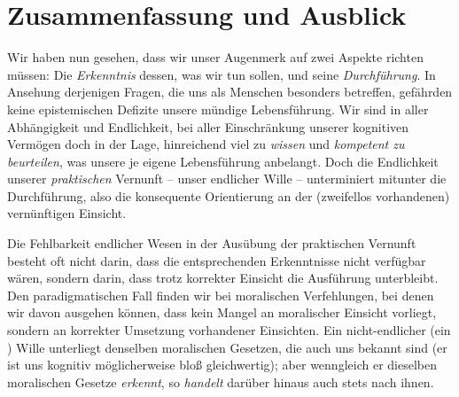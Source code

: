 \section{Zusammenfassung und Ausblick}
Wir haben nun gesehen, dass wir unser Augenmerk auf zwei Aspekte
richten müssen: Die \emph{Erkenntnis} dessen, was wir tun sollen, und seine
\emph{Durchführung}.
In Ansehung derjenigen Fragen, die uns als Menschen besonders betreffen,
gefährden keine epistemischen Defizite unsere mündige Lebensführung. Wir
sind in aller Abhängigkeit und Endlichkeit, bei aller Einschränkung unserer
kognitiven Vermögen doch in der Lage, hinreichend viel zu \emph{wissen} und
\emph{kompetent zu beurteilen}, was unsere je eigene Lebensführung anbelangt.
Doch die Endlichkeit unserer \emph{praktischen} Vernunft -- unser endlicher
Wille -- unterminiert mitunter die Durchführung, also die konsequente
Orientierung an der (zweifellos vorhandenen) vernünftigen Einsicht.

Die Fehlbarkeit endlicher Wesen in der Ausübung der praktischen Vernunft besteht
oft nicht darin, dass die entsprechenden Erkenntnisse nicht verfügbar wären, sondern
darin, dass trotz korrekter Einsicht die Ausführung unterbleibt. Den
paradigmatischen Fall finden wir bei moralischen Verfehlungen, bei denen wir
davon ausgehen können, dass kein Mangel an moralischer Einsicht vorliegt,
sondern an korrekter Umsetzung vorhandener Einsichten. Ein nicht-endlicher
(ein ) Wille unterliegt denselben moralischen Gesetzen,
die auch uns bekannt sind (er ist uns kognitiv möglicherweise bloß gleichwertig);
aber wenngleich er dieselben moralischen Gesetze \emph{erkennt}, so \emph{handelt}
darüber hinaus auch stets nach ihnen.

